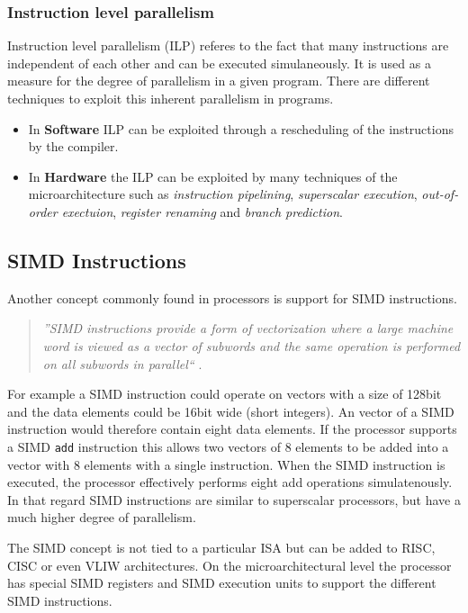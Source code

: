 \documentclass[a4paper,10pt]{article}
\begin{document}
\subsubsection*{Instruction level parallelism}
Instruction level parallelism (ILP) referes to the fact that many instructions are independent of each other and can be
executed simulaneously. It is used as a measure for the degree of parallelism in a given program. There are different techniques to
exploit this inherent parallelism in programs.
\begin{itemize}
 \item In \textbf{Software} ILP can be exploited through a rescheduling of the instructions by the compiler.
 \item In \textbf{Hardware} the ILP can be exploited by many techniques of the microarchitecture such as \textit{instruction pipelining},
 \textit{superscalar execution}, \textit{out-of-order exectuion}, \textit{register renaming} and \textit{branch prediction}.
\end{itemize}

\subsection{SIMD Instructions}
Another concept commonly found in processors is support for SIMD instructions.
\begin{quote}
    \textit{''SIMD instructions provide a form of vectorization where a large machine word is viewed as a vector of subwords and the same
    operation is performed on all subwords in parallel``} \cite{simd}.
\end{quote}
For example a SIMD instruction could operate on vectors with a size of 128bit and the data elements could be 16bit wide (short integers).
An vector of a SIMD instruction would therefore contain eight data elements. If the processor supports a SIMD \lstinline{add} instruction
this allows two vectors of 8 elements to be added into a vector with 8 elements with a single instruction. When the SIMD instruction is
executed, the processor effectively performs eight add operations simulatenously. In that regard SIMD instructions are similar to
superscalar processors, but have a much higher degree of parallelism.

The SIMD concept is not tied to a particular ISA but can be added to RISC, CISC or even VLIW architectures. On the microarchitectural
level the processor has special SIMD registers and SIMD execution units to support the different SIMD instructions.
\end{document}
